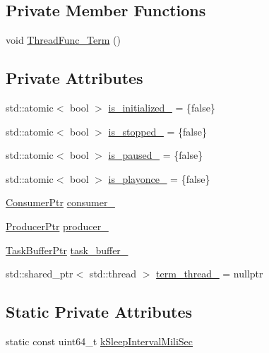 \subsection*{Private Member Functions}
\begin{DoxyCompactItemize}
\item 
void \hyperlink{classapollo_1_1cyber_1_1record_1_1Player_ac25ec278b511f4dd55b742326821c7b5}{Thread\-Func\-\_\-\-Term} ()
\end{DoxyCompactItemize}
\subsection*{Private Attributes}
\begin{DoxyCompactItemize}
\item 
std\-::atomic$<$ bool $>$ \hyperlink{classapollo_1_1cyber_1_1record_1_1Player_af26d2f34900605500fa1955ac2b3838a}{is\-\_\-initialized\-\_\-} = \{false\}
\item 
std\-::atomic$<$ bool $>$ \hyperlink{classapollo_1_1cyber_1_1record_1_1Player_a06233a1abd0c23ffe9c60d5ff2072178}{is\-\_\-stopped\-\_\-} = \{false\}
\item 
std\-::atomic$<$ bool $>$ \hyperlink{classapollo_1_1cyber_1_1record_1_1Player_ad00ace4d6e2aa7ea28bcddd8465c1c73}{is\-\_\-paused\-\_\-} = \{false\}
\item 
std\-::atomic$<$ bool $>$ \hyperlink{classapollo_1_1cyber_1_1record_1_1Player_aa72c517c6103865219e1ae06bea8c626}{is\-\_\-playonce\-\_\-} = \{false\}
\item 
\hyperlink{classapollo_1_1cyber_1_1record_1_1Player_a37e1db52ec97f2d722a96728ee34eca4}{Consumer\-Ptr} \hyperlink{classapollo_1_1cyber_1_1record_1_1Player_ad2321d30d8cff70ed29c66eafc24fc1c}{consumer\-\_\-}
\item 
\hyperlink{classapollo_1_1cyber_1_1record_1_1Player_acc295a5b34f4d9286c0e5abdb19708cc}{Producer\-Ptr} \hyperlink{classapollo_1_1cyber_1_1record_1_1Player_a3c9d9a11a48225b805ee705d9ec84a36}{producer\-\_\-}
\item 
\hyperlink{classapollo_1_1cyber_1_1record_1_1Player_ab31c13eb2f49c83db3e5ab2241e4a649}{Task\-Buffer\-Ptr} \hyperlink{classapollo_1_1cyber_1_1record_1_1Player_a7a09a28c3998b3d7f897ced5e0deaef7}{task\-\_\-buffer\-\_\-}
\item 
std\-::shared\-\_\-ptr$<$ std\-::thread $>$ \hyperlink{classapollo_1_1cyber_1_1record_1_1Player_a2b9c27a08ad0b994faf3476196daea5c}{term\-\_\-thread\-\_\-} = nullptr
\end{DoxyCompactItemize}
\subsection*{Static Private Attributes}
\begin{DoxyCompactItemize}
\item 
static const uint64\-\_\-t \hyperlink{classapollo_1_1cyber_1_1record_1_1Player_a9e39f4fbfcd0aa471833f3e33e3ed61a}{k\-Sleep\-Interval\-Mili\-Sec}
\end{DoxyCompactItemize}


